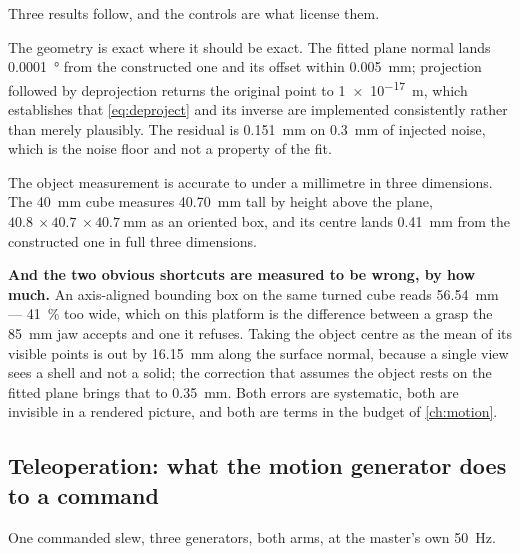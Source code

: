 Three results follow, and the controls are what license them.

The geometry is exact where it should be exact. The fitted plane normal lands
\SI{0.0001}{\degree} from the constructed one and its offset within
\SI{0.005}{\milli\metre}; projection followed by deprojection returns the
original point to \SI{1e-17}{\metre}, which establishes that
\cref{eq:deproject} and its inverse are implemented consistently rather than
merely plausibly. The residual is \SI{0.151}{\milli\metre} on
\SI{0.3}{\milli\metre} of injected noise, which is the noise floor and not a
property of the fit.

The object measurement is accurate to under a millimetre in three dimensions.
The \SI{40}{\milli\metre} cube measures \SI{40.70}{\milli\metre} tall by
height above the plane, $\SI{40.8}{} \times \SI{40.7}{} \times
\SI{40.7}{\milli\metre}$ as an oriented box, and its centre lands
\SI{0.41}{\milli\metre} from the constructed one in full three dimensions.

\textbf{And the two obvious shortcuts are measured to be wrong, by how much.}
An axis-aligned bounding box on the same turned cube reads
\SI{56.54}{\milli\metre} --- \SI{41}{\percent} too wide, which on this
platform is the difference between a grasp the \SI{85}{\milli\metre} jaw
accepts and one it refuses. Taking the object centre as the mean of its
visible points is out by \SI{16.15}{\milli\metre} along the surface normal,
because a single view sees a shell and not a solid; the correction that
assumes the object rests on the fitted plane brings that to
\SI{0.35}{\milli\metre}. Both errors are systematic, both are invisible in a
rendered picture, and both are terms in the budget of \cref{ch:motion}.

\subsection{Teleoperation: what the motion generator does to a command}
\label{sec:sim-motion}

One commanded slew, three generators, both arms, at the master's own
\SI{50}{\hertz}.

\begin{table}[htbp]
  \centering
  \small
  \caption[Three motion generators on one slew]{The same commanded
  displacement through three generators. \emph{Off-path} is the largest
  distance the end effector leaves the straight line between the endpoints,
  against a \SI{30}{\milli\metre} grasp capture gate. \emph{Same-cycle} is
  the largest single-cycle displacement, which is what a controller has to
  execute. \emph{Peak $\dot{q}$ of limit} is the fastest commanded joint
  speed as a multiple of the manufacturer's declared limit. The last column
  is whether all seven joints arrive on the same cycle.}
  \label{tab:sim-generators}
  
\end{table}

